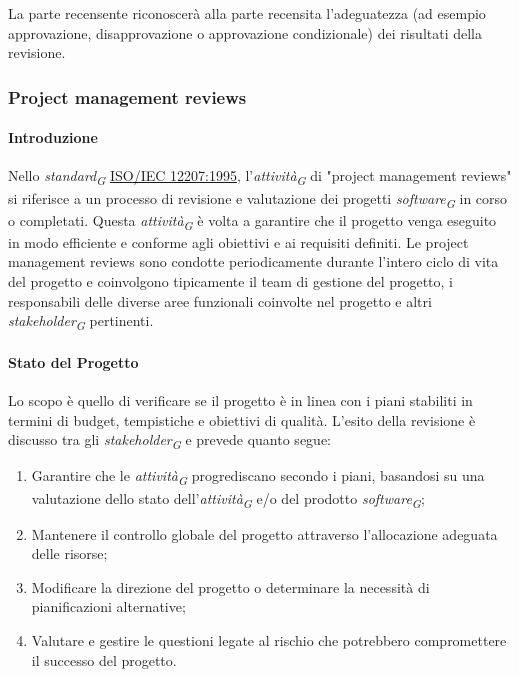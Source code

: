 La parte recensente riconoscerà alla parte recensita l'adeguatezza (ad esempio approvazione, disapprovazione o approvazione condizionale) dei risultati della revisione. 

\subsubsection{Project management reviews}

\paragraph{Introduzione}
Nello \textit{standard}\textsubscript{\textit{G}} \href{https://www.math.unipd.it/~tullio/IS-1/2009/Approfondimenti/ISO_12207-1995.pdf}{ISO/IEC 12207:1995}, l'\textit{attività}\textsubscript{\textit{G}} di "project management reviews" si riferisce a un processo di revisione e valutazione dei progetti \textit{software}\textsubscript{\textit{G}} in corso o completati. Questa \textit{attività}\textsubscript{\textit{G}} è volta a garantire che il progetto venga eseguito in modo efficiente e conforme agli obiettivi e ai requisiti definiti.
Le project management reviews sono condotte periodicamente durante l'intero ciclo di vita del progetto e coinvolgono tipicamente il team di gestione del progetto, i responsabili delle diverse aree funzionali coinvolte nel progetto e altri \textit{stakeholder}\textsubscript{\textit{G}} pertinenti.

\paragraph{Stato del Progetto}
Lo scopo è quello di verificare se il progetto è in linea con i piani stabiliti in termini di budget, tempistiche e obiettivi di qualità.
L'esito della revisione è discusso tra gli \textit{stakeholder}\textsubscript{\textit{G}} e prevede quanto segue:
\begin{enumerate}
    \item Garantire che le \textit{attività}\textsubscript{\textit{G}} progrediscano secondo i piani, basandosi su una valutazione dello stato dell'\textit{attività}\textsubscript{\textit{G}} e/o del prodotto \textit{software}\textsubscript{\textit{G}};
    \item Mantenere il controllo globale del progetto attraverso l'allocazione adeguata delle risorse;
    \item Modificare la direzione del progetto o determinare la necessità di pianificazioni alternative;
    \item Valutare e gestire le questioni legate al rischio che potrebbero compromettere il successo del progetto.
\end{enumerate}

